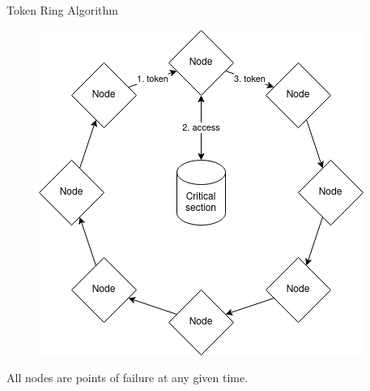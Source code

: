 \documentclass[aspectratio=1610,17pt,utf8]{beamer}
\begin{document}
\begin{frame}{Token Ring Algorithm}
    \begin{minipage}{.45\textwidth}
        \begin{figure}
            \includegraphics[width=\textwidth]{figures/1-token.png}
        \end{figure}
    \end{minipage}
    \begin{minipage}{.5\textwidth}
        \tiny{All nodes are points of failure at any given time.}
    \end{minipage}
\end{frame}
\end{document}
